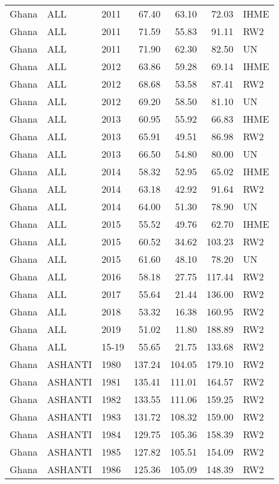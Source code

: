 \begin{longtable}{lllrrrl}
  Ghana & ALL & 2011 & 67.40 & 63.10 & 72.03 & IHME \\ 
  Ghana & ALL & 2011 & 71.59 & 55.83 & 91.11 & RW2 \\ 
  Ghana & ALL & 2011 & 71.90 & 62.30 & 82.50 & UN \\ 
  Ghana & ALL & 2012 & 63.86 & 59.28 & 69.14 & IHME \\ 
  Ghana & ALL & 2012 & 68.68 & 53.58 & 87.41 & RW2 \\ 
  Ghana & ALL & 2012 & 69.20 & 58.50 & 81.10 & UN \\ 
  Ghana & ALL & 2013 & 60.95 & 55.92 & 66.83 & IHME \\ 
  Ghana & ALL & 2013 & 65.91 & 49.51 & 86.98 & RW2 \\ 
  Ghana & ALL & 2013 & 66.50 & 54.80 & 80.00 & UN \\ 
  Ghana & ALL & 2014 & 58.32 & 52.95 & 65.02 & IHME \\ 
  Ghana & ALL & 2014 & 63.18 & 42.92 & 91.64 & RW2 \\ 
  Ghana & ALL & 2014 & 64.00 & 51.30 & 78.90 & UN \\ 
  Ghana & ALL & 2015 & 55.52 & 49.76 & 62.70 & IHME \\ 
  Ghana & ALL & 2015 & 60.52 & 34.62 & 103.23 & RW2 \\ 
  Ghana & ALL & 2015 & 61.60 & 48.10 & 78.20 & UN \\ 
  Ghana & ALL & 2016 & 58.18 & 27.75 & 117.44 & RW2 \\ 
  Ghana & ALL & 2017 & 55.64 & 21.44 & 136.00 & RW2 \\ 
  Ghana & ALL & 2018 & 53.32 & 16.38 & 160.95 & RW2 \\ 
  Ghana & ALL & 2019 & 51.02 & 11.80 & 188.89 & RW2 \\ 
  Ghana & ALL & 15-19 & 55.65 & 21.75 & 133.68 & RW2 \\ 
  Ghana & ASHANTI & 1980 & 137.24 & 104.05 & 179.10 & RW2 \\ 
  Ghana & ASHANTI & 1981 & 135.41 & 111.01 & 164.57 & RW2 \\ 
  Ghana & ASHANTI & 1982 & 133.55 & 111.06 & 159.25 & RW2 \\ 
  Ghana & ASHANTI & 1983 & 131.72 & 108.32 & 159.00 & RW2 \\ 
  Ghana & ASHANTI & 1984 & 129.75 & 105.36 & 158.39 & RW2 \\ 
  Ghana & ASHANTI & 1985 & 127.82 & 105.51 & 154.09 & RW2 \\ 
  Ghana & ASHANTI & 1986 & 125.36 & 105.09 & 148.39 & RW2 \\ 

\end{longtable}
